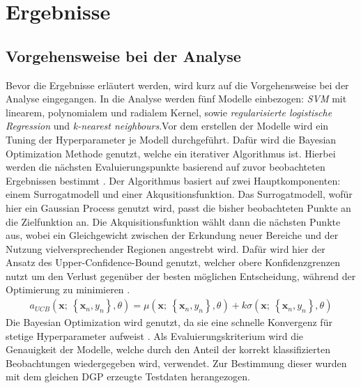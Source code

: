 \documentclass[
]{article}
\begin{document}
\section{Ergebnisse}

\subsection{Vorgehensweise bei der Analyse}

Bevor die Ergebnisse erläutert werden, wird kurz auf die Vorgehensweise
bei der Analyse eingegangen. In die Analyse werden fünf Modelle
einbezogen: \textit{SVM} mit linearem, polynomialem und radialem Kernel,
sowie \textit{regularisierte logistische Regression} und
\textit{k-nearest neighbours}.\newline Vor dem erstellen der Modelle
wird ein Tuning der Hyperparameter je Modell durchgeführt. Dafür wird
die Bayesian Optimization Methode genutzt, welche ein iterativer
Algorithmus ist. Hierbei werden die nächsten Evaluierungspunkte
basierend auf zuvor beobachteten Ergebnissen bestimmt
\parencite{yangHyperparameterOptimizationMachine2020}. Der Algorithmus
basiert auf zwei Hauptkomponenten: einem Surrogatmodell und einer
Akqusitionsfunktion. Das Surrogatmodell, wofür hier ein Gaussian Process
genutzt wird, passt die bisher beobachteten Punkte an die Zielfunktion
an. Die Akquisitionsfunktion wählt dann die nächsten Punkte aus, wobei
ein Gleichgewicht zwischen der Erkundung neuer Bereiche und der Nutzung
vielversprechender Regionen angestrebt wird. Dafür wird hier der Ansatz
des Upper-Confidence-Bound genutzt, welcher obere Konfidenzgrenzen nutzt
um den Verlust gegenüber der besten möglichen Entscheidung, während der
Optimierung zu minimieren
\parencite{snoekPracticalBayesianOptimization2012}. \begin{align}
a_{UCB}(\mathbf{x};~\left\{\mathbf{x}_n,y_n\right\},\theta) = \mu(\mathbf{x};~\left\{\mathbf{x}_n,y_n\right\},\theta) + k \sigma(\mathbf{x};~\left\{\mathbf{x}_n,y_n\right\},\theta)
\end{align} Die Bayesian Optimization wird genutzt, da sie eine schnelle
Konvergenz für stetige Hyperparameter aufweist
\parencite{yangHyperparameterOptimizationMachine2020}. Als
Evaluierungskriterium wird die Genauigkeit der Modelle, welche durch den
Anteil der korrekt klassifizierten Beobachtungen wiedergegeben wird,
verwendet. Zur Bestimmung dieser wurden mit dem gleichen DGP erzeugte
Testdaten herangezogen.
\end{document}
